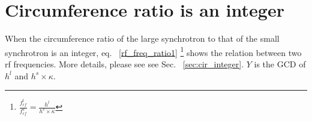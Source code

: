 %
%
% 
%
\section{Circumference ratio is an integer}
\label{sec:integ}
When the circumference ratio of the large synchrotron to that of the small synchrotron is an integer, eq. ~\ref{rf_freq_ratio1} \footnote{$\frac{f_{\mathit{rf}}^{l}}{f_{\mathit{rf}}^{s}}= \frac{h^l}{h^s \times \kappa}$} shows the relation between two rf frequencies. More details, please see see Sec. ~\ref{sec:cir_integer}. $Y$ is the \gls{GCD} of $h^l$ and $h^s \times \kappa$.

